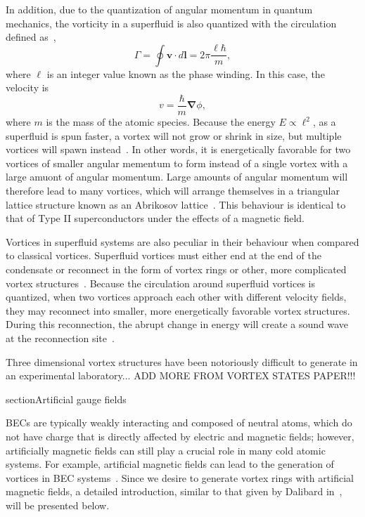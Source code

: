 In addition, due to the quantization of angular momentum in quantum mechanics, the vorticity in a superfluid is also quantized with the circulation defined as~\cite{Pethick2002},
\begin{equation}
\Gamma = \oint\mathbf{v} \cdot d \mathbf{l} = 2\pi \frac{\ell \hbar}{m},
\label{Eq:phase}
\end{equation}
where $\ell$ is an integer value known as the phase winding.
In this case, the velocity is
\begin{equation}
v = \frac{\hbar}{m}\mathbf{\nabla}\phi,
\end{equation}
where $m$ is the mass of the atomic species.
Because the energy $E \propto \ell^2$, as a superfluid is spun faster, a vortex will not grow or shrink in size, but multiple vortices will spawn instead~\cite{Pethick2002}.
In other words, it is energetically favorable for two vortices of smaller angular mementum to form instead of a single vortex with a large amuont of angular momentum.
Large amounts of angular momentum will therefore lead to many vortices, which will arrange themselves in a triangular lattice structure known as an Abrikosov lattice~\cite{Abrikosov1957, Fetter2001}.
This behaviour is identical to that of Type II superconductors under the effects of a magnetic field.

Vortices in superfluid systems are also peculiar in their behaviour when compared to classical vortices.
Superfluid vortices must either end at the end of the condensate or reconnect in the form of vortex rings or other, more complicated vortex structures~\cite{Reichl2013}.
Because the circulation around superfluid vortices is quantized, when two vortices approach each other with different velocity fields, they may reconnect into smaller, more energetically favorable vortex structures.
During this reconnection, the abrupt change in energy will create a sound wave at the reconnection site~\cite{Feynman1955}.

Three dimensional vortex structures have been notoriously difficult to generate in an experimental laboratory... ADD MORE FROM VORTEX STATES PAPER!!!

section{Artificial gauge fields}
\label{sec:gauge}

BECs are typically weakly interacting and composed of neutral atoms, which do not have charge that is directly affected by electric and magnetic fields; however, artificially magnetic fields can still play a crucial role in many cold atomic systems.
For example, artificial magnetic fields can lead to the generation of vortices in BEC systems~\cite{Lin2009}.
Since we desire to generate vortex rings with artificial magnetic fields, a detailed introduction, similar to that given by Dalibard in~\cite{Dalibard2015}, will be presented below.

